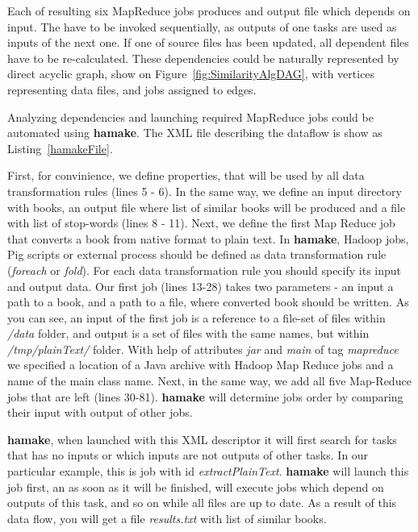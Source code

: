 \documentclass[10pt,conference,letterpaper]{IEEEtran}
\begin{document}
Each of resulting six MapReduce jobs produces and output file which
depends on input. The have to be invoked sequentially, as outputs of
one tasks are used as inputs of the next one. If one of source files
has been updated, all dependent files have to be re-calculated. These
dependencies could be naturally represented by direct acyclic graph,
show on Figure~\ref{fig:SimilarityAlgDAG}, with vertices representing
data files, and jobs assigned to edges.

Analyzing dependencies and launching required MapReduce jobs could be
automated using \textbf{hamake}. The XML file describing the dataflow
is show as Listing~\ref{hamakeFile}.

First, for convinience, we define properties, that will be used by all
data transformation rules (lines 5 - 6). In the same way, we define an
input directory with books, an output file where list of similar books
will be produced and a file with list of stop-words (lines 8 - 11).
Next, we define the first Map Reduce job that converts a book from
native format to plain text. In \textbf{hamake}, Hadoop jobs, Pig scripts or
external process should be defined as data transformation rule
(\textit{foreach} or \textit{fold}). For each data transformation rule
you should specify its input and output data. Our first job (lines
13-28) takes two parameters - an input a path to a book, and a path to
a file, where converted book should be written.  As you can see, an
input of the first job is a reference to a file-set of files within
\textit{/data} folder, and output is a set of files with the same
names, but within \textit{/tmp/plainText/} folder. With help of
attributes \textit{jar} and \textit{main} of tag \textit{mapreduce} we
specified a location of a Java archive with Hadoop Map Reduce jobs and
a name of the main class name. Next, in the same way, we add all five
Map-Reduce jobs that are left (lines 30-81). \textbf{hamake} will determine
jobs order by comparing their input with output of other jobs.



\textbf{hamake}, when launched with this XML descriptor it will first search
for tasks that has no inputs or which inputs are not outputs of other
tasks. In our particular example, this is job with id
\textit{extractPlainText}. \textbf{hamake} will launch this job first, an as
soon as it will be finished, will execute jobs which depend on outputs
of this task, and so on while all files are up to date. As a result of
this data flow, you will get a file \textit{results.txt} with list of
similar books.
\end{document}
